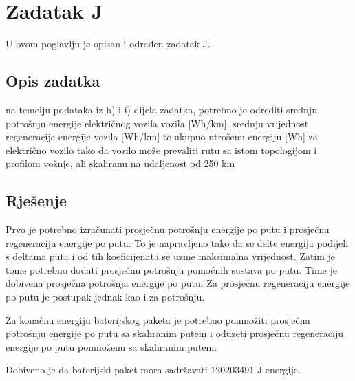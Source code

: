 \chapter{Zadatak J} \label{ch:j}

U ovom poglavlju je opisan i odrađen zadatak J.

\section{Opis zadatka} \label{sec:j:opis}

na temelju podataka iz h) i i) dijela zadatka, potrebno je odrediti srednju potrošnju energije
električnog vozila vozila [Wh/km], srednju vrijednost regeneracije energije vozila [Wh/km] te ukupno
utrošenu energiju [Wh] za električno vozilo tako da vozilo može prevaliti rutu sa istom topologijom i
profilom vožnje, ali skaliranu na udaljenost od 250 km

\section{Rješenje} \label{sec:j:rjesenje}

Prvo je potrebno izračunati prosječnu potrošnju energije po putu i prosječnu
regeneraciju energije po putu. To je napravljeno tako da se delte energija
podijeli s deltama puta i od tih koeficijenata se uzme maksimalna vrijednost.
Zatim je tome potrebno dodati prosječnu potrošnju pomoćnih sustava po putu. Time
je dobivena prosječna potrošnja energije po putu.
Za prosječnu regeneraciju energije po putu je postupak jednak kao i za potrošnju.

Za konačnu energiju baterijskog paketa je potrebno pomnožiti prosječnu potrošnju
energije po putu sa skaliranim putem i oduzeti prosječnu regeneraciju energije po
putu pomnoženu sa skaliranim putem.

Dobiveno je da baterijski paket mora sadržavati 120203491 J energije.

